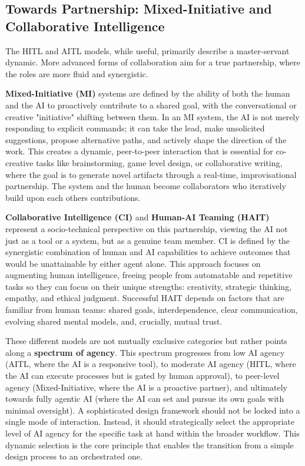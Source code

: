 \documentclass[
  12pt,
  a4paper,
  bibliography=totoc,
  numbers=noenddot
]{scrartcl}
\begin{document}
\subsection{Towards Partnership:
Mixed-Initiative and Collaborative
Intelligence}\label{towards-partnership-mixed-initiative-and-collaborative-intelligence}

The HITL and AITL models, while useful, primarily describe a
master-servant dynamic. More advanced forms of collaboration aim for a
true partnership, where the roles are more fluid and synergistic.

\textbf{Mixed-Initiative (MI)} systems are defined by the ability of
both the human and the AI to proactively contribute to a shared goal,
with the conversational or creative "initiative" shifting between
them.\cite{aimagazine2025mixed} In an MI system, the AI is not merely
responding to explicit commands; it can take the lead, make unsolicited
suggestions, propose alternative paths, and actively shape the direction
of the work.\cite{goldsmiths2025mixed} This creates a dynamic, peer-to-peer
interaction that is essential for co-creative tasks like brainstorming,
game level design, or collaborative writing, where the goal is to
generate novel artifacts through a real-time, improvisational
partnership.\cite{researchgate2025boosting} The system and the human become
collaborators who iteratively build upon each other\textquotesingle s
contributions.\cite{researchgate2025implications}

\textbf{Collaborative Intelligence (CI)} and \textbf{Human-AI Teaming
(HAIT)} represent a socio-technical perspective on this partnership,
viewing the AI not just as a tool or a system, but as a genuine team
member.\cite{pmc2025defining} CI is defined by the synergistic combination
of human and AI capabilities to achieve outcomes that would be
unattainable by either agent alone.\cite{tandfonline2025collaborative} This approach
focuses on augmenting human intelligence, freeing people from
automatable and repetitive tasks so they can focus on their unique
strengths: creativity, strategic thinking, empathy, and ethical
judgment.\cite{smythos2025exploring} Successful HAIT depends on factors that
are familiar from human teams: shared goals, interdependence, clear
communication, evolving shared mental models, and, crucially, mutual
trust.\cite{pmc2025defining}

These different models are not mutually exclusive categories but rather
points along a \textbf{spectrum of agency}. This spectrum progresses
from low AI agency (AITL, where the AI is a responsive tool), to
moderate AI agency (HITL, where the AI can execute processes but is
gated by human approval), to peer-level agency (Mixed-Initiative, where
the AI is a proactive partner), and ultimately towards fully agentic AI
(where the AI can set and pursue its own goals with minimal
oversight).\cite{nice2025forrester} A sophisticated design framework should
not be locked into a single mode of interaction. Instead, it should
strategically select the appropriate level of AI agency for the specific
task at hand within the broader workflow. This dynamic selection is the
core principle that enables the transition from a simple design process
to an orchestrated one.
\end{document}
